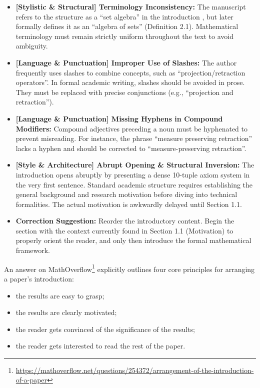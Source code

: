 \documentclass[11pt, a4paper]{article}
\begin{document}
\begin{itemize}
    \item \textcolor{RustOrange}{\textbf{[Stylistic \& Structural] Terminology Inconsistency:}} The manuscript refers to the structure as a ``set algebra'' in the introduction , but later formally defines it as an ``algebra of sets'' (Definition 2.1). Mathematical terminology must remain strictly uniform throughout the text to avoid ambiguity.
    
    \item \textcolor{NavyBlue}{\textbf{[Language \& Punctuation] Improper Use of Slashes:}} The author frequently uses slashes to combine concepts, such as ``projection/retraction operators''. In formal academic writing, slashes should be avoided in prose. They must be replaced with precise conjunctions (e.g., ``projection and retraction'').
    
    \item \textcolor{NavyBlue}{\textbf{[Language \& Punctuation] Missing Hyphens in Compound Modifiers:}} Compound adjectives preceding a noun must be hyphenated to prevent misreading. For instance, the phrase ``measure preserving retraction''  lacks a hyphen and should be corrected to ``measure-preserving retraction''.
    \item \textcolor{RustOrange}{\textbf{[Style \& Architecture] Abrupt Opening \& Structural Inversion:}} The introduction opens abruptly by presenting a dense 10-tuple axiom system in the very first sentence. Standard academic structure requires establishing the general background and research motivation before diving into technical formalities. The actual motivation is awkwardly delayed until Section 1.1.
    
    \item \textbf{Correction Suggestion:} Reorder the introductory content. Begin the section with the context currently found in Section 1.1 (Motivation) to properly orient the reader, and only then introduce the formal mathematical framework.
\end{itemize}
An answer on MathOverflow\footnote{\url{https://mathoverflow.net/questions/254372/arrangement-of-the-introduction-of-a-paper}} explicitly outlines four core principles for arranging a paper's introduction:
\begin{itemize}
    \item the results are easy to grasp;
    \item the results are clearly motivated;
    \item the reader gets convinced of the significance of the results;
    \item the reader gets interested to read the rest of the paper.
\end{itemize}
\end{document}
